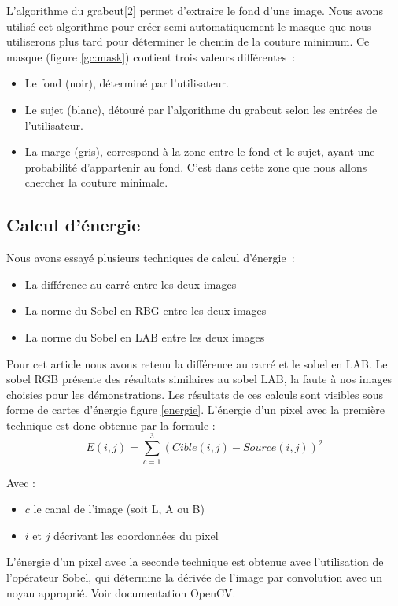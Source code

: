 \documentclass[a4paper]{article}
\begin{document}
L'algorithme du grabcut[2] permet d'extraire le fond d'une image. 
Nous avons utilisé cet algorithme pour créer semi automatiquement le masque que nous utiliserons plus tard
pour déterminer le chemin de la couture minimum. 
Ce masque (figure \ref{gc:mask}) contient trois valeurs différentes~:

\begin{itemize}
    \item Le fond (noir), déterminé par l'utilisateur. 
    \item Le sujet (blanc), détouré par l'algorithme du grabcut selon les entrées de l'utilisateur.
    \item La marge (gris), correspond à la zone entre le fond et le sujet, ayant une probabilité d'appartenir au fond. C'est dans cette zone que nous allons chercher la couture minimale.
\end{itemize}

\subsection{Calcul d'énergie}

Nous avons essayé plusieurs techniques de calcul d'énergie~:

\begin{itemize}
    \item La différence au carré entre les deux images
    \item La norme du Sobel en RBG entre les deux images
    \item La norme du Sobel en LAB entre les deux images
\end{itemize}

Pour cet article nous avons retenu la différence au carré et le sobel en LAB. Le sobel RGB présente des résultats
similaires au sobel LAB, la faute à nos images choisies pour les démonstrations. %
Les résultats de ces calculs sont visibles sous forme de cartes d'énergie figure \ref{energie}.
L'énergie d'un pixel avec la première technique est donc obtenue par la formule :
\[
    E(i,j) = \sum_{c=1}^{3} (Cible (i,j) - Source (i,j))^2
\]

Avec :
\begin{itemize}
    \item $c$ le canal de l'image (soit L, A ou B)
    \item $i$ et $j$ décrivant les coordonnées du pixel
\end{itemize}

L'énergie d'un pixel avec la seconde technique est obtenue avec l'utilisation de l'opérateur Sobel, qui détermine la dérivée de l'image par convolution avec un noyau approprié. Voir documentation OpenCV.
\end{document}
